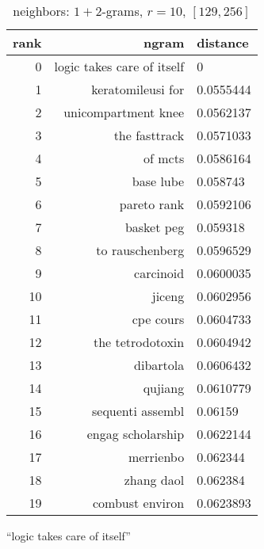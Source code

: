 \begin{table}[ht]
\begin{subtable}[t]{.45\textwidth}
        \centering
        \begin{tabularx}{\textwidth}{r R l}
            \toprule
            rank & ngram & distance\\
            \midrule
            \num{0} & logic takes care of itself & \num{0}\\
            \num{1} & keratomileusi for & \num{0.0555444}\\
            \num{2} & unicompartment knee & \num{0.0562137}\\
            \num{3} & the fasttrack & \num{0.0571033}\\
            \num{4} & of mcts & \num{0.0586164}\\
            \num{5} & base lube & \num{0.058743}\\
            \num{6} & pareto rank & \num{0.0592106}\\
            \num{7} & basket peg & \num{0.059318}\\
            \num{8} & to rauschenberg & \num{0.0596529}\\
            \num{9} & carcinoid & \num{0.0600035}\\
            \num{10} & jiceng & \num{0.0602956}\\
            \num{11} & cpe cours & \num{0.0604733}\\
            \num{12} & the tetrodotoxin & \num{0.0604942}\\
            \midrule
            \num{13} & dibartola & \num{0.0606432}\\
            \num{14} & qujiang & \num{0.0610779}\\
            \num{15} & sequenti assembl & \num{0.06159}\\
            \num{16} & engag scholarship & \num{0.0622144}\\
            \num{17} & merrienbo & \num{0.062344}\\
            \num{18} & zhang daol & \num{0.062384}\\
            \num{19} & combust environ & \num{0.0623893}\\
            \bottomrule
        \end{tabularx}
        \caption{\enquote{logic takes care of itself}}\label{tab:ranking_chance_2}
    \end{subtable}
    \caption{neighbors: $1+2$-grams, $r = 10$, $[129,256]$}\label{tab:ranking_chance}
\end{table}

